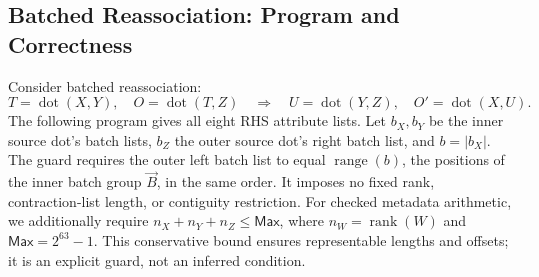\subsection{Batched Reassociation: Program and Correctness}
\label{app:batched-reassociation}
\label{extended:sec:partitioning}
Consider batched reassociation:
\begin{equation}
 T=\operatorname{dot}(X,Y),\quad O=\operatorname{dot}(T,Z)
 \quad\Rightarrow\quad
 U=\operatorname{dot}(Y,Z),\quad O'=\operatorname{dot}(X,U).
\end{equation}
The following program gives all eight RHS attribute lists. Let $b_X,b_Y$ be the inner source dot's batch lists,
$b_Z$ the outer source dot's right batch list, and $b=|b_X|$. The guard
requires the outer left batch list to equal $\operatorname{range}(b)$,
the positions of the inner batch group $\vec B$, in the same order. It imposes
no fixed rank, contraction-list length, or contiguity restriction.
For checked metadata arithmetic, we additionally require
$n_X+n_Y+n_Z\le\mathsf{Max}$, where $n_W=\operatorname{rank}(W)$ and
$\mathsf{Max}=2^{63}-1$. This conservative bound ensures representable
lengths and offsets; it is an explicit guard, not an inferred condition.

